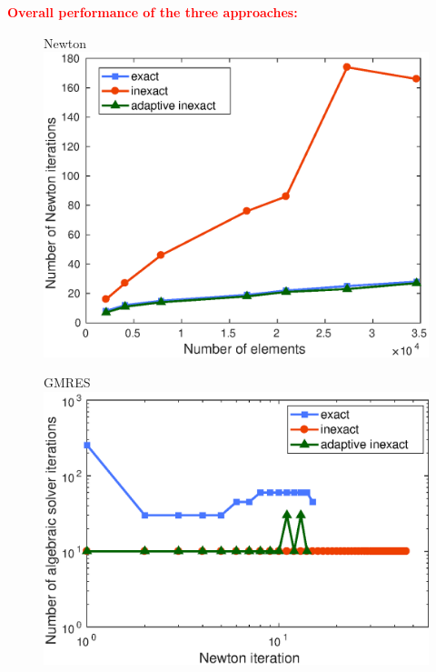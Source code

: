 \documentclass{beamer}
\begin{document}
\begin{frame}

\textcolor{red}{\textbf{Overall performance of the three approaches:}}
\begin{figure}[H]
\begin{minipage}[c]{.42\linewidth}
   \centering 
   Newton
\includegraphics[width=\textwidth]{fig_article/comparison_three_methods_number_Newton_iter_number_elements.eps}    
\end{minipage}\hfill
\begin{minipage}[c]{.44\linewidth}
\centering
GMRES
\includegraphics[width=\textwidth]{fig_article/comparison_three_methods_number_Gmres_iter_number_newton_step.eps}    

\end{minipage}
\end{figure}
\end{frame}
\end{document}
